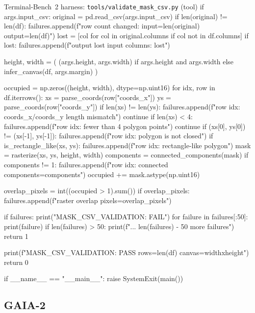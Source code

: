 \documentclass{llmxive}
\begin{document}
\begin{promptbox}{Terminal-Bench~2 harness: \texttt{tools/validate\_mask\_csv.py} (tool)}
    if args.input_csv:
        original = pd.read_csv(args.input_csv)
        if len(original) != len(df):
            failures.append(f"row count changed: input={len(original)} output={len(df)}")
        lost = [col for col in original.columns if col not in df.columns]
        if lost:
            failures.append(f"output lost input columns: {lost}")

    height, width = (
        (args.height, args.width)
        if args.height and args.width
        else infer_canvas(df, args.margin)
    )

    occupied = np.zeros((height, width), dtype=np.uint16)
    for idx, row in df.iterrows():
        xs = parse_coords(row["coords_x"])
        ys = parse_coords(row["coords_y"])
        if len(xs) != len(ys):
            failures.append(f"row {idx}: coords_x/coords_y length mismatch")
            continue
        if len(xs) < 4:
            failures.append(f"row {idx}: fewer than 4 polygon points")
            continue
        if (xs[0], ys[0]) != (xs[-1], ys[-1]):
            failures.append(f"row {idx}: polygon is not closed")
        if is_rectangle_like(xs, ys):
            failures.append(f"row {idx}: rectangle-like polygon")
        mask = rasterize(xs, ys, height, width)
        components = connected_components(mask)
        if components != 1:
            failures.append(f"row {idx}: connected components={components}")
        occupied += mask.astype(np.uint16)

    overlap_pixels = int((occupied > 1).sum())
    if overlap_pixels:
        failures.append(f"raster overlap pixels={overlap_pixels}")

    if failures:
        print("MASK_CSV_VALIDATION: FAIL")
        for failure in failures[:50]:
            print(failure)
        if len(failures) > 50:
            print(f"... {len(failures) - 50} more failures")
        return 1

    print(f"MASK_CSV_VALIDATION: PASS rows={len(df)} canvas={width}x{height}")
    return 0


if __name__ == "__main__":
    raise SystemExit(main())
\end{promptbox}

\subsection{GAIA-2}
\end{document}
